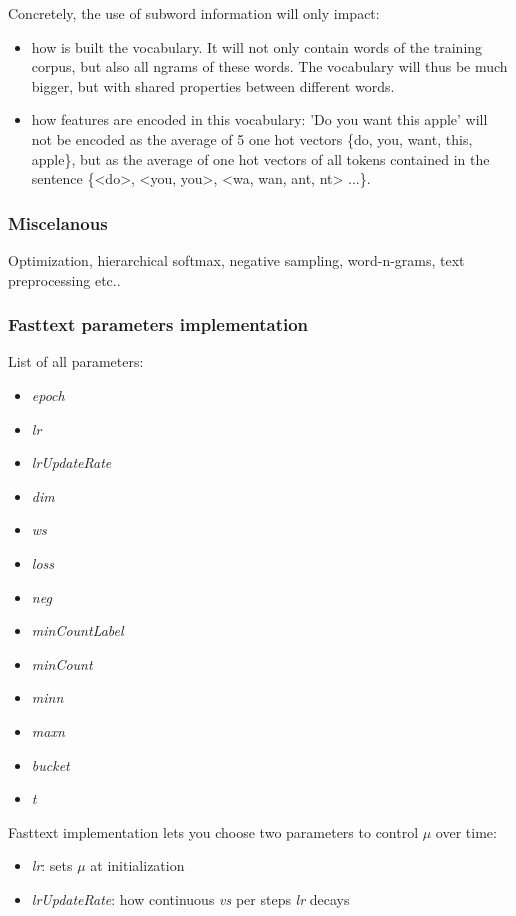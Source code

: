 Concretely, the use of subword information will only impact:
\begin{itemize}
	\item how is built the vocabulary. It will not only contain words of the training corpus, but also all ngrams of these words. The vocabulary will thus be much bigger, but with shared properties between different words.
	\item how features are encoded in this vocabulary: 'Do you want this apple' will not be encoded as the average of 5 one hot vectors \{do, you, want, this, apple\}, but as the average of one hot vectors of all tokens contained in the sentence \{<do>, <you, you>, <wa, wan, ant, nt> ...\}.
\end{itemize}

\subsubsection{Miscelanous}

Optimization, hierarchical softmax, negative sampling, word-n-grams, text preprocessing etc..


\subsubsection{Fasttext parameters implementation}

List of all parameters:
\begin{multicols}{3}
\begin{itemize}
	\item \textit{epoch}
	\item \textit{lr}
	\item \textit{lrUpdateRate}
	\item \textit{dim}
	\item \textit{ws}
	\item \textit{loss}
	\item \textit{neg}
	\item \textit{minCountLabel}
	\item \textit{minCount}
	\item \textit{minn}
	\item \textit{maxn}
	\item \textit{bucket}
	\item \textit{t}
\end{itemize}
\end{multicols}

Fasttext implementation lets you choose two parameters to control $\mu$ over time:
\begin{itemize}
	\item \textit{lr}: sets $\mu$ at initialization
	\item \textit{lrUpdateRate}: how continuous \textit{vs} per steps \textit{lr} decays
\end{itemize}

